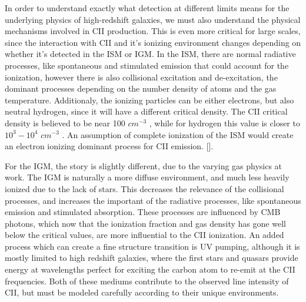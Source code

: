 \documentclass[manuscript]{aastex}
\begin{document}
In order to understand exactly what detection at different limits means for the underlying physics of high-redshift galaxies, we must also understand the physical mechanisms involved in CII production. This is even more critical for large scales, since the interaction with CII and it's ionizing environment changes depending on whether it's detected in the ISM or IGM. In the ISM, there are normal radiative processes, like spontaneous and stimulated emission that could account for the ionization, however there is also collisional excitation and de-excitation, the dominant processes depending on the number density of atoms and the gas temperature. Additionaly, the ionizing particles can be either electrons, but also neutral hydrogen, since it will have a different critical density. The CII critical density is believed to be near 100 $cm ^{-3}$ , while for hydrogen this value is closer to $10^{3} - 10^{4}$  $cm^{-3}$ .  An assumption of complete ionization of the ISM would create an electron ionizing dominant process for CII emission. [\cite{Gong2012}]. 

For the IGM, the story is slightly different, due to the varying gas physics at work. The IGM is naturally a more diffuse environment, and much less heavily ionized due to the lack of stars. This decreases the relevance of the collisional processes, and increases the important of the radiative processes, like spontaneous emission and stimulated absorption. These processes are influenced by CMB photons, which now that the ionization fraction and gas density has gone well below the critical values, are more influential to the CII ionization. An added process which can create a fine structure transition is UV pumping, although it is mostly limited to high redshift galaxies, where the first stars and quasars provide energy at wavelengths perfect for exciting the carbon atom to re-emit at the CII frequencies. Both of these mediums contribute to the observed line intensity of CII, but must be modeled carefully according to their unique environments. 
\end{document}
